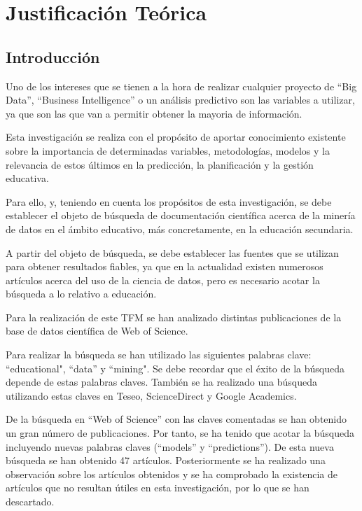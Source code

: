 \chapter{Justificación Teórica}
\section{Introducción}

Uno de los intereses que se tienen a la hora de realizar cualquier proyecto de ``Big Data'', ``Business Intelligence'' o un análisis predictivo son las variables a utilizar, ya que son las que van a permitir obtener la mayoria de información.

Esta investigación se realiza con el propósito de aportar conocimiento existente sobre la importancia de determinadas variables, metodologías, modelos y la relevancia de estos últimos en la predicción, la planificación y la gestión educativa. 

Para ello, y, teniendo en cuenta los propósitos de esta investigación, se debe establecer el objeto de búsqueda de documentación científica acerca de la minería de datos en el ámbito educativo, más concretamente, en la educación secundaria. 

A partir del objeto de búsqueda, se debe establecer las fuentes que se utilizan para obtener resultados fiables, ya que en la actualidad existen numerosos artículos acerca del uso de la ciencia de datos, pero es necesario acotar la búsqueda a lo relativo a educación.

Para la realización de este TFM se han analizado distintas publicaciones de la base de datos científica de Web of Science. 

Para realizar la búsqueda se han utilizado las siguientes palabras clave: ``educational", ``data'' y ``mining". Se debe recordar que el éxito de la búsqueda depende de estas palabras claves. También se ha realizado una búsqueda utilizando estas claves en Teseo, ScienceDirect y Google Academics.

De la búsqueda en ``Web of Science'' con las claves comentadas se han obtenido un gran número de publicaciones. Por tanto, se ha tenido que acotar la búsqueda incluyendo nuevas palabras claves (``models'' y ``predictions''). De esta nueva búsqueda se han obtenido 47 artículos. Posteriormente se ha realizado una observación sobre los artículos obtenidos y se ha comprobado la existencia de artículos que no resultan útiles en esta investigación, por lo que se han descartado.

